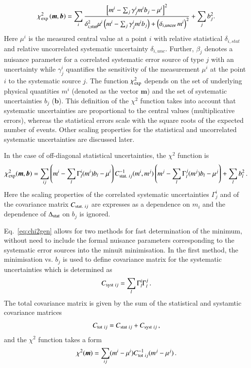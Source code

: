 %
\begin{equation}
 \chi^2_{\rm exp}\left(\boldsymbol{m},\boldsymbol{b}\right) = %
 \sum_i
 \frac{\left[m^i
- \sum_j \gamma^i_j m^i b_j  - {\mu^i} \right]^2}
{ \textstyle \delta^2_{i,{\rm stat}}\mu^i \left(m^i -  \sum_j \gamma^i_j m^i b_j\right)+
\left(\delta_{i,{\rm uncor}}\,  m^i\right)^2}
 + \sum_j b^2_j.
\label{eq:ave}\end{equation}
%
Here ${\mu^i}$ is the  measured central value  at a point $i$ 
with  relative statistical $\delta_{i,stat}$ 
and relative uncorrelated systematic uncertainty $\delta_{i,unc}$.
Further, $\beta_j$ denotes a nuisance parameter for
 a correlated systematic error  source of type $j$ with an uncertainty
 while
$\gamma^i_j$ 
quantifies the sensitivity of the
measurement ${\mu^i}$ at the point $i$ to the systematic source $j$. 
The function $\chi^2_{\rm exp}$ depends on the set of
underlying physical quantities $m^i$ 
(denoted as the vector $\boldsymbol{m}$) and 
 the set of systematic uncertainties $b_j$ ($\boldsymbol{b}$).
This definition of the $\chi^2$ function takes into account that
systematic uncertainties are proportional to the central values 
(multiplicative errors), whereas the statistical errors scale 
with the square roots of the expected number of events. 
Other scaling properties for the statistical and uncorrelated
systematic uncertainties 
are discussed later.



In the case of off-diagonal statistical uncertainties, the $\chi^2$ function
is
\begin{equation} \label{eq:chi2gen}
\chi^2_{\rm exp} (\boldsymbol{m},\boldsymbol{b}) = \sum_{ij} \left ( m^i - \sum_l \Gamma^i_l(m^i)b_l - \mu^i \right)
  C^{-1}_{{\rm stat.}~ij}(m^i,m^j) \left(  m^j - \sum_l \Gamma^j_l(m^j)b_l - \mu^j \right) + 
\sum_l b^2_l \,.
\end{equation}
Here the scaling properties of the correlated systematic uncertainties 
$\Gamma^i_j$ and
of the covariance matrix $C_{{\rm stat.}~ij}$ are expresses as a dependence
on $m_i$ and the dependence of $\Delta_{\rm stat}$ on $b_j$ is ignored.

Eq.~\ref{eq:chi2gen} allows for two methods for fast determination
of the minimum, without need to include the formal nuisance parameters
corresponding to the systematic error sources into the minuit minimisation.
In the first method, the minimisation vs. $b_j$ is used to define covariance
matrix for the systematic uncertainties which is determined as
\begin{equation}
 C_{{\rm syst}~ij}= \sum_l \Gamma^i_l \Gamma^j_l \,.
\end{equation}
The total covariance matrix is given by the sum of the statistical and
systamtic covariance matrices
\begin{equation} 
C_{{\rm tot}~ij} = C_{{\rm stat}~ij} + C_{{\rm syst}~ij}\,,
\end{equation}
and the $\chi^2$ function takes a form
\begin{equation}
  \chi^2( \boldsymbol{m}) = \sum_{ij} ( m^i - \mu^i) C^{-1}_{{\rm tot}~ij} 
( m^j - \mu^j)\,.
\end{equation}

